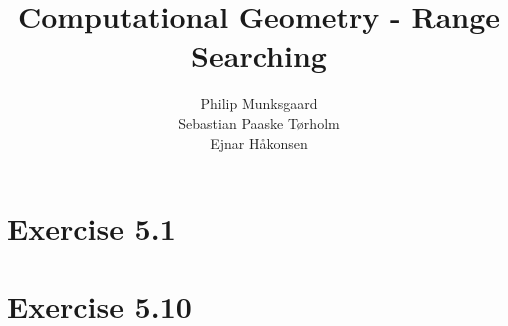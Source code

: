\documentclass[11pt,a4paper]{article}
\title{Computational Geometry - Range Searching}
\author{Philip Munksgaard \\ Sebastian Paaske Tørholm \\ Ejnar Håkonsen}
\begin{document}
\maketitle

\section{Exercise 5.1}

\section{Exercise 5.10}
\end{document}
